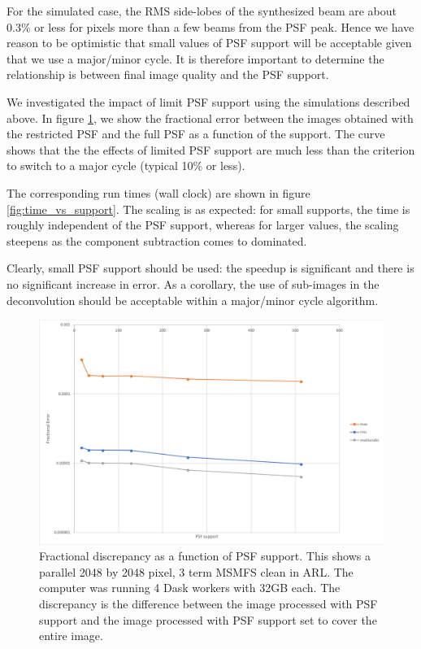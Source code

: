 \documentclass[11pt,a4paper,variablewidth]{article}
\begin{document}
For the simulated case, the RMS side-lobes of the synthesized beam are about 0.3\% or less for pixels more than a few beams from the PSF peak. Hence we have reason to be optimistic that small values of PSF support will be acceptable given that we use a major/minor cycle. It is therefore important to determine the relationship is between final image quality and the PSF support. 

We investigated the impact of limit PSF support using the simulations described above. In figure \ref{fig:error_vs_support}, we show the fractional error between the images obtained with the restricted PSF and the full PSF as a function of the support. The curve shows that the the effects of limited PSF support are much less than the criterion to switch to a major cycle (typical 10\% or less).

The corresponding run times (wall clock) are shown in figure \ref{fig:time_vs_support}. The scaling is as expected: for small supports, the time is roughly independent of the PSF support, whereas for larger values, the scaling steepens as the component subtraction comes to dominated.

Clearly, small PSF support should be used: the speedup is significant and there is no significant increase in error. As a corollary, the use of sub-images in the deconvolution should be acceptable within a major/minor cycle algorithm.

\begin{figure}[H]
  \centering
  \includegraphics[width=\textwidth]{./error_versus_support.png}
  \caption{Fractional discrepancy as a function of PSF support. This shows a parallel 2048 by 2048 pixel, 3 term MSMFS clean in ARL. The computer was running 4 Dask workers with 32GB each. The discrepancy is the difference between the image processed with PSF support and the image processed with PSF support set to cover the entire image.}
  \label{fig:error_vs_support}
\end{figure}
\end{document}
